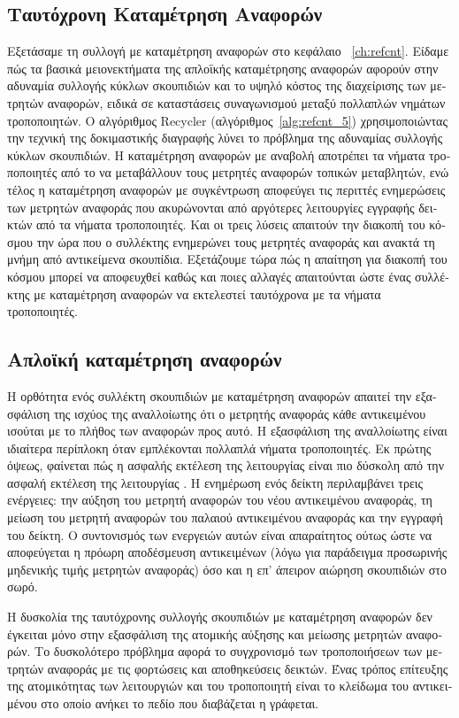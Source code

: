 \begin{greek}
\section{Ταυτόχρονη Καταμέτρηση Αναφορών}
Εξετάσαμε τη συλλογή με καταμέτρηση αναφορών στο κεφάλαιο
~\ref{ch:refcnt}. Είδαμε πώς τα βασικά μειονεκτήματα της
απλοϊκής καταμέτρησης αναφορών αφορούν στην αδυναμία συλλογής
κύκλων σκουπιδιών και το υψηλό κόστος της διαχείρισης των
μετρητών αναφορών, ειδικά σε καταστάσεις συναγωνισμού μεταξύ
πολλαπλών νημάτων τροποποιητών. Ο αλγόριθμος Recycler (αλγόριθμος~\ref{alg:refcnt_5})
χρησιμοποιώντας την τεχνική της
δοκιμαστικής διαγραφής λύνει το πρόβλημα της αδυναμίας συλλογής
κύκλων σκουπιδιών. Η καταμέτρηση αναφορών με αναβολή αποτρέπει
τα νήματα τροποποιητές από το να μεταβάλλουν τους μετρητές
αναφορών τοπικών μεταβλητών, ενώ τέλος η καταμέτρηση αναφορών
με συγκέντρωση αποφεύγει τις περιττές ενημερώσεις των μετρητών
αναφοράς που ακυρώνονται από αργότερες λειτουργίες εγγραφής
δεικτών από τα νήματα τροποποιητές. Και οι τρεις λύσεις απαιτούν
την διακοπή του κόσμου την ώρα που ο συλλέκτης ενημερώνει τους
μετρητές αναφοράς και ανακτά τη μνήμη από αντικείμενα σκουπίδια. 
Εξετάζουμε τώρα πώς η απαίτηση για διακοπή του κόσμου μπορεί
να αποφευχθεί καθώς και ποιες αλλαγές απαιτούνται ώστε ένας
συλλέκτης με καταμέτρηση αναφορών να εκτελεστεί ταυτόχρονα με
τα νήματα τροποποιητές.

\subsection{Απλοϊκή καταμέτρηση αναφορών}
Η ορθότητα ενός συλλέκτη σκουπιδιών με καταμέτρηση αναφορών
απαιτεί την εξασφάλιση της ισχύος της αναλλοίωτης ότι ο μετρητής
αναφοράς κάθε αντικειμένου ισούται με το πλήθος των αναφορών
προς αυτό. Η εξασφάλιση της αναλλοίωτης είναι ιδιαίτερα περίπλοκη
όταν εμπλέκονται πολλαπλά νήματα τροποποιητές. Εκ πρώτης όψεως,
φαίνεται πώς η ασφαλής εκτέλεση της λειτουργίας \textenglish{}
είναι πιο δύσκολη από την ασφαλή εκτέλεση της λειτουργίας
\textenglish{}. Η ενημέρωση ενός δείκτη περιλαμβάνει τρεις
ενέργειες: την αύξηση του μετρητή αναφορών του νέου αντικειμένου
αναφοράς, τη μείωση του μετρητή αναφορών του παλαιού αντικειμένου
αναφοράς και την εγγραφή του δείκτη. Ο συντονισμός των ενεργειών
αυτών είναι απαραίτητος ούτως ώστε να αποφεύγεται η πρόωρη
αποδέσμευση αντικειμένων (λόγω για παράδειγμα προσωρινής μηδενικής
τιμής μετρητών αναφοράς) όσο και η επ' άπειρον αιώρηση σκουπιδιών
στο σωρό.

Η δυσκολία της ταυτόχρονης συλλογής σκουπιδιών με καταμέτρηση αναφορών δεν έγκειται μόνο στην
εξασφάλιση της ατομικής αύξησης και μείωσης μετρητών αναφορών. Το δυσκολότερο πρόβλημα αφορά
το συγχρονισμό των τροποποιήσεων των μετρητών αναφοράς με τις φορτώσεις και αποθηκεύσεις
δεικτών. Ένας τρόπος επίτευξης της ατομικότητας των λειτουργιών \textenglish{} και 
\textenglish{} του τροποποιητή είναι το κλείδωμα του αντικειμένου στο οποίο ανήκει το πεδίο
που διαβάζεται η γράφεται. 


\end{greek}
